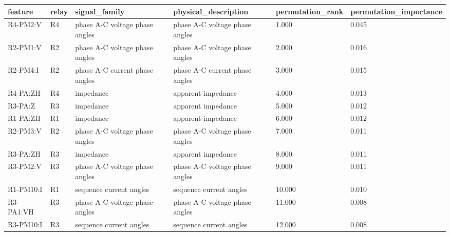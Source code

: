 \begin{tabular}{llllll}
\toprule
feature & relay & signal_family & physical_description & permutation_rank & permutation_importance \\
\midrule
R4-PM2:V & R4 & phase A-C voltage phase angles & phase A-C voltage phase angles & 1.000 & 0.045 \\
R2-PM1:V & R2 & phase A-C voltage phase angles & phase A-C voltage phase angles & 2.000 & 0.016 \\
R2-PM4:I & R2 & phase A-C current phase angles & phase A-C current phase angles & 3.000 & 0.015 \\
R4-PA:ZH & R4 & impedance & apparent impedance & 4.000 & 0.013 \\
R3-PA:Z & R3 & impedance & apparent impedance & 5.000 & 0.012 \\
R1-PA:ZH & R1 & impedance & apparent impedance & 6.000 & 0.012 \\
R2-PM3:V & R2 & phase A-C voltage phase angles & phase A-C voltage phase angles & 7.000 & 0.011 \\
R3-PA:ZH & R3 & impedance & apparent impedance & 8.000 & 0.011 \\
R3-PM2:V & R3 & phase A-C voltage phase angles & phase A-C voltage phase angles & 9.000 & 0.011 \\
R1-PM10:I & R1 & sequence current angles & sequence current angles & 10.000 & 0.010 \\
R3-PA1:VH & R3 & phase A-C voltage phase angles & phase A-C voltage phase angles & 11.000 & 0.008 \\
R3-PM10:I & R3 & sequence current angles & sequence current angles & 12.000 & 0.008 \\
\bottomrule
\end{tabular}
